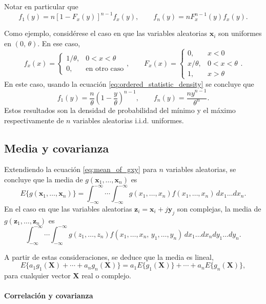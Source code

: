 \documentclass[a4paper]{report}
\newcommand{\X}{\mathbf{X}}
\newcommand{\x}{\mathbf{x}}
\newcommand{\y}{\mathbf{y}}
\newcommand{\z}{\mathbf{z}}
\begin{document}
Notar en particular que
\[
 f_1(y)=n[1-F_x(y)]^{n-1}f_x(y),\qquad f_n(y)=nF_x^{n-1}(y)f_x(y).
\]

Como ejemplo, considérese el caso en que las variables aleatorias \(\x_i\) son uniformes en \((0,\,\theta)\). En ese caso,
\[
 f_x(x)
 =\left\{\begin{array}{ll}
   1/\theta, & 0<x<\theta\\ 
   0, & \textrm{en otro caso}
 \end{array} \right.,
 \qquad
 F_x(x)
 =\left\{\begin{array}{ll}
   0, & x<0\\
   x/\theta, & 0<x<\theta\\ 
   1, & x>\theta
 \end{array} \right..
\]
En este caso, usando la ecuación \ref{eq:ordered_statistic_density} se concluye que
\begin{equation}\label{eq:ordered_statistic_uniform_density}
  f_1(y)=\frac{n}{\theta}\left(1-\frac{y}{\theta}\right)^{n-1},\qquad f_n(y)=\frac{ny^{n-1}}{\theta^n}. 
\end{equation}
Estos resultados son la densidad de probabilidad del mínimo y el máximo respectivamente de \(n\) variables aleatorias i.i.d. uniformes.

\subsection{Media y covarianza}

Extendiendo la ecuación \ref{eq:mean_of_gxy} para \(n\) variables aleatorias, se concluye que la media de \(g(\x_1,\dots,\x_n)\) es
\[
 E\{g(\x_1,\dots,\x_n)\}=\int_{-\infty}^{-\infty}\cdots\int_{-\infty}^{-\infty}g(x_1,\dots,x_n)f(x_1,\dots,x_n)\,dx_1\dots dx_n.
\]
En el caso en que las variables aleatorias \(\z_i=\x_i+j\y_j\) son complejas, la media de \(g(\z_1,\dots,\z_n)\) es
\[
 \int_{-\infty}^{-\infty}\cdots\int_{-\infty}^{-\infty}g(z_1,\dots,z_n)f(x_1,\dots,x_n,\,y_1,\dots,y_n)\,dx_1\dots dx_ndy_1\dots dy_n.
\]

A partir de estas consideraciones, se deduce que la media es lineal, 
\[
 E\{a_1g_1(\X)+\cdots+a_ng_n(\X)\}=a_1E\{g_1(\X)\}+\cdots+a_nE\{g_n(\X)\},
\]
para cualquier vector \(\X\) real o complejo.

\paragraph{Correlación y covarianza}
\end{document}
